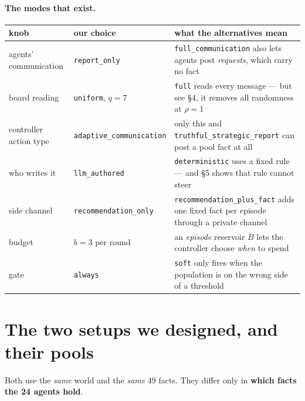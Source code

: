 \documentclass[11pt,a4paper]{article}
\begin{document}
\paragraph{The modes that exist.}
\begin{center}\small
\begin{tabular}{llp{7.6cm}}\toprule
knob & our choice & what the alternatives mean\\\midrule
agents' communication & \texttt{report\_only} & \texttt{full\_communication} also lets agents post \emph{requests}, which carry no fact\\
board reading & \texttt{uniform}, $q{=}7$ & \texttt{full} reads every message --- but see \S4, it removes all randomness at $\rho{=}1$\\
controller action type & \texttt{adaptive\_communication} & only this and \texttt{truthful\_strategic\_report} can post a pool fact at all\\
who writes it & \texttt{llm\_authored} & \texttt{deterministic} uses a fixed rule --- and \S5 shows that rule cannot steer\\
side channel & \texttt{recommendation\_only} & \texttt{recommendation\_plus\_fact} adds one fixed fact per episode through a private channel\\
budget & $b=3$ per round & an \emph{episode} reservoir $B$ lets the controller choose \emph{when} to spend\\
gate & \texttt{always} & \texttt{soft} only fires when the population is on the wrong side of a threshold\\
\bottomrule\end{tabular}\end{center}

\section{The two setups we designed, and their pools}

Both use the \emph{same} world and the \emph{same} 49 facts. They differ only in
\textbf{which facts the 24 agents hold}.
\end{document}
